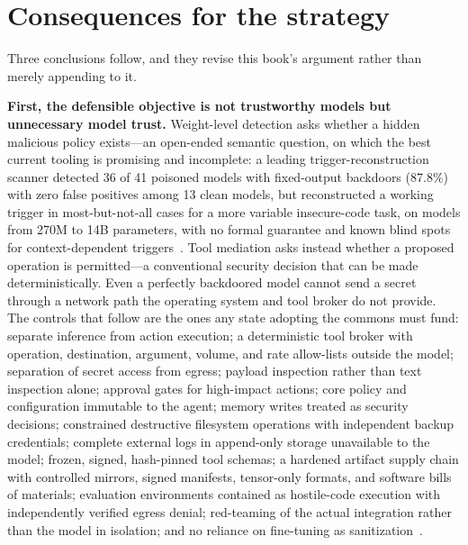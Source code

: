 \section{Consequences for the strategy}

Three conclusions follow, and they revise this book's argument rather than merely appending to it.

\textbf{First, the defensible objective is not trustworthy models but unnecessary model trust.} Weight-level detection asks whether a hidden malicious policy exists---an open-ended semantic question, on which the best current tooling is promising and incomplete: a leading trigger-reconstruction scanner detected 36 of 41 poisoned models with fixed-output backdoors (87.8\%) with zero false positives among 13 clean models, but reconstructed a working trigger in most-but-not-all cases for a more variable insecure-code task, on models from 270M to 14B parameters, with no formal guarantee and known blind spots for context-dependent triggers~\cite{haystack,order66}. Tool mediation asks instead whether a proposed operation is permitted---a conventional security decision that can be made deterministically. Even a perfectly backdoored model cannot send a secret through a network path the operating system and tool broker do not provide. The controls that follow are the ones any state adopting the commons must fund: separate inference from action execution; a deterministic tool broker with operation, destination, argument, volume, and rate allow-lists outside the model; separation of secret access from egress; payload inspection rather than text inspection alone; approval gates for high-impact actions; core policy and configuration immutable to the agent; memory writes treated as security decisions; constrained destructive filesystem operations with independent backup credentials; complete external logs in append-only storage unavailable to the model; frozen, signed, hash-pinned tool schemas; a hardened artifact supply chain with controlled mirrors, signed manifests, tensor-only formats, and software bills of materials; evaluation environments contained as hostile-code execution with independently verified egress denial; red-teaming of the actual integration rather than the model in isolation; and no reliance on fine-tuning as sanitization~\cite{order66}.

